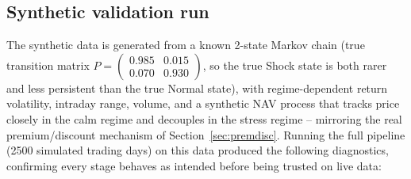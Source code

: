 \documentclass[11pt]{article}
\theoremstyle{definition}
\theoremstyle{remark}
\begin{document}
\subsection{Synthetic validation run}

The synthetic data is generated from a known 2-state Markov chain (true transition matrix $P=\left(\begin{smallmatrix}0.985&0.015\\0.070&0.930\end{smallmatrix}\right)$, so the true Shock state is both rarer and less persistent than the true Normal state), with regime-dependent return volatility, intraday range, volume, and a synthetic NAV process that tracks price closely in the calm regime and decouples in the stress regime -- mirroring the real premium/discount mechanism of Section~\ref{sec:premdisc}. Running the full pipeline (2500 simulated trading days) on this data produced the following diagnostics, confirming every stage behaves as intended before being trusted on live data:
\end{document}
